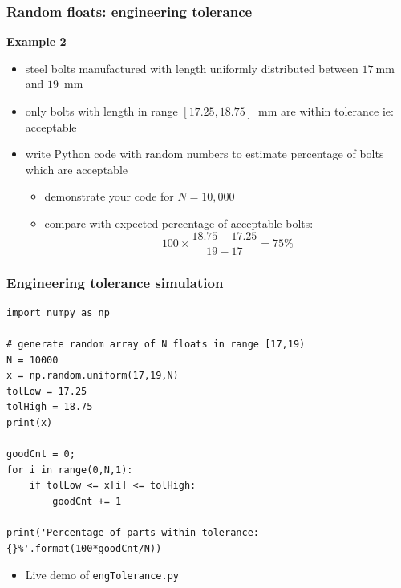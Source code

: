 \documentclass[english,14pt]{beamer}
\begin{document}

\begin{frame}[fragile]

\frametitle{Random floats: engineering tolerance}

\textbf{Example 2}\\
\vspace*{2mm}
\begin{itemize}
	\item steel bolts manufactured with length uniformly distributed between $17~$mm and $19$~mm
	\item only bolts with length in range $[17.25,18.75]$~mm are within tolerance ie: acceptable
	\item write Python code with random numbers to estimate percentage of bolts which are acceptable
	\begin{itemize}
		\item demonstrate your code for $N=10,000$
		\item compare with expected percentage of acceptable bolts:
		\[
			100 \times \frac{18.75-17.25}{19-17} = 75\%
		\]
	\end{itemize}
\end{itemize}

\end{frame}


\begin{frame}[fragile]

\frametitle{Engineering tolerance simulation}
\vspace*{-3mm}
\begin{lstlisting}[style=CStyle]
import numpy as np

# generate random array of N floats in range [17,19)
N = 10000
x = np.random.uniform(17,19,N)
tolLow = 17.25
tolHigh = 18.75
print(x)

goodCnt = 0;
for i in range(0,N,1):
    if tolLow <= x[i] <= tolHigh:
        goodCnt += 1

print('Percentage of parts within tolerance: {}%'.format(100*goodCnt/N))
\end{lstlisting}
\vspace*{-3mm}
\begin{itemize}
	\item Live demo of \texttt{engTolerance.py}
\end{itemize}
\end{frame}
\end{document}
